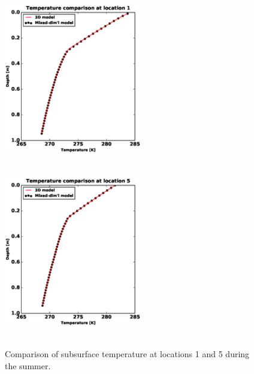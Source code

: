 \documentclass[review]{elsarticle}
\begin{document}
\begin{figure}[!htpb]
\centering
\includegraphics[height = 7.5cm, width=6cm]{figures/comparison/regular/ss-temp/comp-temp-loc1-cycle0020.eps}
\includegraphics[height = 7.5cm, width=6cm]{figures/comparison/regular/ss-temp/comp-temp-loc5-cycle0020.eps}
\caption{Comparison of subsurface temperature at locations 1 and 5 during the summer.}
\label{ss-temp-comp}
\end{figure}
\end{document}
